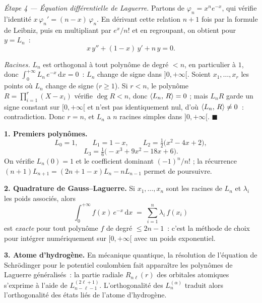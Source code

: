 \begin{mdframed}[style=proofbar]
  \medskip
  \textit{Étape 4 — Équation différentielle de Laguerre.}
  Partons de $\varphi_n=x^n e^{-x}$, qui vérifie l'identité
  $x\,\varphi_n'=(n-x)\,\varphi_n$. En dérivant cette relation $n+1$ fois par
  la formule de Leibniz, puis en multipliant par $e^{x}/n!$ et en regroupant,
  on obtient pour $y=L_n$~:
  \[
    x\,y'' + (1-x)\,y' + n\,y = 0.
  \]

  \smallskip
  \emph{Racines.} $L_n$ est orthogonal à tout polynôme de degré $<n$, en
  particulier à $1$, donc $\int_0^{+\infty} L_n\,e^{-x}\,\mathrm{d}x=0$~:
  $L_n$ change de signe dans $]0,+\infty[$. Soient $x_1,\ldots,x_r$ les points
  où $L_n$ change de signe ($r\geq 1$). Si $r<n$, le polynôme
  $R=\prod_{i=1}^r(X-x_i)$ vérifie $\deg R<n$, donc $\langle L_n,\,R\rangle=0$ ; mais
  $L_n R$ garde un signe constant sur $[0,+\infty[$ et n'est pas
  identiquement nul, d'où $\langle L_n,\,R\rangle\neq 0$~: contradiction. Donc $r=n$,
  et $L_n$ a $n$ racines simples dans $]0,+\infty[$.
  \hfill$\blacksquare$
\end{mdframed}

\decsep{}



\begin{mdframed}[style=exbar]
  \textbf{1. Premiers polynômes.}
  \[
    L_0=1,\qquad L_1=1-x,\qquad L_2=\tfrac{1}{2}\bigl(x^2-4x+2\bigr),
  \]
  \[
    L_3=\tfrac{1}{6}\bigl(-x^3+9x^2-18x+6\bigr).
  \]
  On vérifie $L_n(0)=1$ et le coefficient dominant ${(-1)}^n/n!$ ; la
  récurrence $(n+1)L_{n+1}=(2n+1-x)L_n-nL_{n-1}$ permet de poursuivre.

  \smallskip\noindent
  \textbf{2. Quadrature de Gauss--Laguerre.}\enspace%
  Si $x_1,\ldots,x_n$ sont les racines de $L_n$ et $\lambda_i$ les poids
  associés, alors
  \[
    \int_{0}^{+\infty} f(x)\,e^{-x}\,\mathrm{d}x
    \;=\; \sum_{i=1}^{n}\lambda_i\,f(x_i)
  \]
  est \emph{exacte} pour tout polynôme $f$ de degré $\leq 2n-1$~: c'est la
  méthode de choix pour intégrer numériquement sur $[0,+\infty[$ avec un poids
  exponentiel.

  \smallskip\noindent
  \textbf{3. Atome d'hydrogène.}\enspace
  En mécanique quantique, la résolution de l'équation de Schrödinger pour le
  potentiel coulombien fait apparaître les polynômes de Laguerre généralisés~:
  la partie radiale $R_{n\ell}(r)$ des orbitales atomiques s'exprime à l'aide
  de $L_{n-\ell-1}^{(2\ell+1)}$. L'orthogonalité des $L_n^{(\alpha)}$ traduit
  alors l'orthogonalité des états liés de l'atome d'hydrogène.
\end{mdframed}


